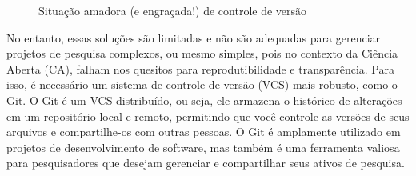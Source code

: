 \documentclass[
  a4paper,
]{article}
\begin{document}
\begin{figure}


\caption{\label{fig-funny-git}Situação amadora (e engraçada!) de
controle de versão}

\end{figure}%

No entanto, essas soluções são limitadas e não são adequadas para
gerenciar projetos de pesquisa complexos, ou mesmo simples, pois no
contexto da Ciência Aberta (CA), falham nos quesitos para
reprodutibilidade e transparência. Para isso, é necessário um sistema de
controle de versão (VCS) mais robusto, como o Git. O Git é um VCS
distribuído, ou seja, ele armazena o histórico de alterações em um
repositório local e remoto, permitindo que você controle as versões de
seus arquivos e compartilhe-os com outras pessoas. O Git é amplamente
utilizado em projetos de desenvolvimento de software, mas também é uma
ferramenta valiosa para pesquisadores que desejam gerenciar e
compartilhar seus ativos de pesquisa.
\end{document}
